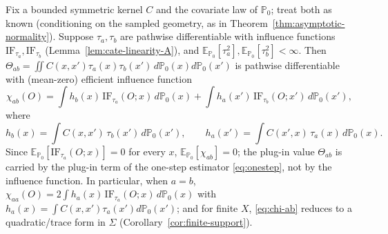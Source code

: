 \begin{lemma}
\label{lem:bilinear-eif-A}
Fix a bounded symmetric kernel $C$ and the covariate law of $\mathbb{P}_0$; treat both as
known (conditioning on the sampled geometry, as in Theorem~\ref{thm:asymptotic-normality}).
Suppose $\tau_a,\tau_b$ are pathwise differentiable with influence functions
$\mathrm{IF}_{\tau_a},\mathrm{IF}_{\tau_b}$ (Lemma~\ref{lem:cate-linearity-A}), and
$\mathbb{E}_{\mathbb{P}_0}[\tau_a^2],\mathbb{E}_{\mathbb{P}_0}[\tau_b^2]<\infty$. Then
$\Theta_{ab}=\iint C(x,x')\tau_a(x)\tau_b(x')\,d\mathbb{P}_0(x)d\mathbb{P}_0(x')$ is pathwise
differentiable with (mean-zero) efficient influence function
\begin{equation}
\chi_{ab}(O)
 = \int h_b(x)\,\mathrm{IF}_{\tau_a}(O;x)\,d\mathbb{P}_0(x)
 + \int h_a(x')\,\mathrm{IF}_{\tau_b}(O;x')\,d\mathbb{P}_0(x'),
\label{eq:chi-ab}
\end{equation}
where
\begin{equation}
h_b(x) = \int C(x,x')\,\tau_b(x')\,d\mathbb{P}_0(x'),
\qquad
h_a(x') = \int C(x',x)\,\tau_a(x)\,d\mathbb{P}_0(x).
\label{eq:h-directions}
\end{equation}
Since $\mathbb{E}_{\mathbb{P}_0}[\mathrm{IF}_{\tau_a}(O;x)]=0$ for every $x$,
$\mathbb{E}_{\mathbb{P}_0}[\chi_{ab}]=0$; the plug-in value $\Theta_{ab}$ is carried by the
plug-in term of the one-step estimator \eqref{eq:onestep}, not by the influence function.
In particular, when $a=b$,
$\chi_{aa}(O) = 2\int h_a(x)\,\mathrm{IF}_{\tau_a}(O;x)\,d\mathbb{P}_0(x)$ with
$h_a(x)=\int C(x,x')\tau_a(x')d\mathbb{P}_0(x')$; and for finite $X$, \eqref{eq:chi-ab}
reduces to a quadratic/trace form in $\Sigma$ (Corollary~\ref{cor:finite-support}).
\end{lemma}

